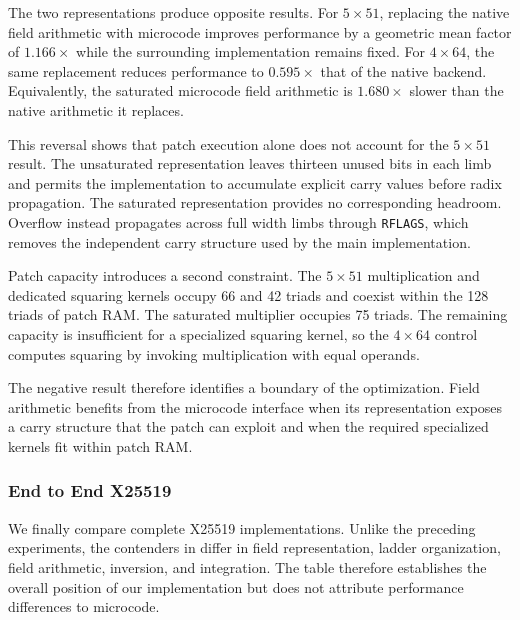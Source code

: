 \documentclass[journal=tches,submission]{iacrtrans}
\newcommand{\code}[1]{\texttt{#1}}
\begin{document}
The two representations produce opposite results.
For $5\times51$, replacing the native field arithmetic with microcode improves performance by a geometric mean factor of $1.166\times$ while the surrounding implementation remains fixed.
For $4\times64$, the same replacement reduces performance to $0.595\times$ that of the native backend.
Equivalently, the saturated microcode field arithmetic is $1.680\times$ slower than the native arithmetic it replaces.

This reversal shows that patch execution alone does not account for the $5\times51$ result.
The unsaturated representation leaves thirteen unused bits in each limb and permits the implementation to accumulate explicit carry values before radix propagation.
The saturated representation provides no corresponding headroom.
Overflow instead propagates across full width limbs through \code{RFLAGS}, which removes the independent carry structure used by the main implementation.

Patch capacity introduces a second constraint.
The $5\times51$ multiplication and dedicated squaring kernels occupy 66 and 42 triads and coexist within the 128 triads of patch RAM.
The saturated multiplier occupies 75 triads.
The remaining capacity is insufficient for a specialized squaring kernel, so the $4\times64$ control computes squaring by invoking multiplication with equal operands.

The negative result therefore identifies a boundary of the optimization.
Field arithmetic benefits from the microcode interface when its representation exposes a carry structure that the patch can exploit and when the required specialized kernels fit within patch RAM.

\subsubsection{End to End X25519}
\label{sec:c25519-e2e}

We finally compare complete X25519 implementations.
Unlike the preceding experiments, the contenders in  differ in field representation, ladder organization, field arithmetic, inversion, and integration.
The table therefore establishes the overall position of our implementation but does not attribute performance differences to microcode.
\end{document}
